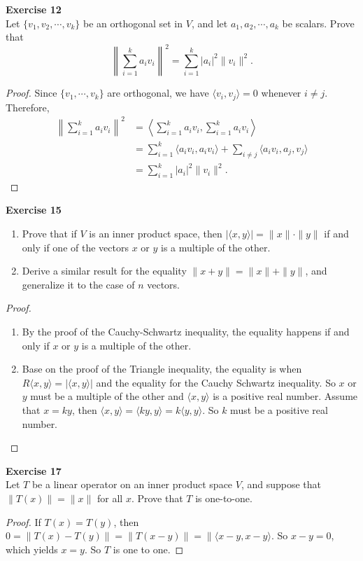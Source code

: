 \documentclass[12pt, a4paper]{article}
\theoremstyle{plain}
\newenvironment{exercise}[2][Exercise]
    { \begin{mdframed}[backgroundcolor=gray!20] \textbf{#1 #2} \\}
    {  \end{mdframed}}
\begin{document}
\begin{exercise}{12}
Let $\{v_1,v_2,\cdots,v_k\}$ be an orthogonal set in $V$, and let $a_1,a_2,\cdots,a_k$ be scalars. Prove that 
\[
\left\|\sum_{i=1}^{k}{a_iv_i}\right\|^2=\sum_{i=1}^{k}{|a_i|^2\|v_i\|^2}.
\]
\end{exercise}
	\begin{proof}
	Since $\{v_1,\cdots,v_k\}$ are orthogonal, we have $\langle{v_i,v_j}\rangle=0$ whenever $i\neq j$. Therefore,
	\begin{align*}
	\left\|\sum_{i=1}^{k}{a_iv_i}\right\|^2&=\left\langle{\sum_{i=1}^{k}{a_iv_i},\sum_{i=1}^{k}{a_iv_i}}\right\rangle\\
	&= \sum_{i=1}^{k}{\langle{a_iv_i,a_iv_i}\rangle}+\sum_{i\neq j}\langle{a_iv_i,a_j,v_j}\rangle\\
	&=\sum_{i=1}^{k}{|a_i|^2\|v_i\|^2}.
	\end{align*}
	\end{proof}
\pagebreak
\begin{exercise}{15}
\hfill
\begin{enumerate}[label=(\alph*)]
\item Prove that if $V$ is an inner product space, then $|\langle{x,y}\rangle|=\|x\|\cdot\|y\|$ if and only if one of the vectors $x$ or $y$ is a multiple of the other.
\item Derive a similar result for the equality $\|x+y\|=\|x\|+\|y\|$, and generalize it to the case of $n$ vectors.
\end{enumerate}
\end{exercise}
\begin{proof}
\hfill
\begin{enumerate}[label=(\alph*)]
\item By the proof of the Cauchy-Schwartz inequality, the equality happens if and only if $x$ or $y$ is a multiple of the other.
\item Base on the proof of the Triangle inequality, the equality is when $R\langle{x,y}\rangle=|\langle{x,y}\rangle|$ and the equality for the Cauchy Schwartz inequality. So $x$ or $y$ must be a multiple of the other and $\langle{x,y}\rangle$ is a positive real number. Assume that $x=ky$, then $\langle{x,y}\rangle=\langle{ky,y}\rangle=k\langle{y,y}\rangle$. So $k$ must be a positive real number.
\end{enumerate}
\end{proof}

\begin{exercise}{17}
Let $T$ be a linear operator on an inner product space $V$, and suppose that $\|T(x)\|=\|x\|$ for all $x$. Prove that $T$ is one-to-one.
\end{exercise}
	\begin{proof}
	If $T(x)=T(y)$, then $0=\|T(x)-T(y)\|=\|T(x-y)\|=\|\langle{x-y,x-y}\rangle$. So $x-y=0$, which yields $x=y$. So $T$ is one to one.
	\end{proof}
\end{document}
